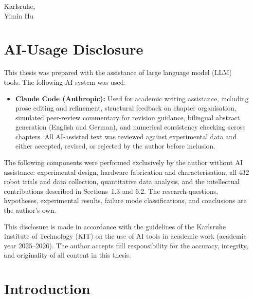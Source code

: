 \documentclass[12pt, a4paper]{report}
\begin{document}
\vspace{1.5cm}
\noindent Karlsruhe, \hspace{3cm} \underline{\hspace{5cm}}\\
\hspace*{4.5cm} Yimin Hu

\chapter*{AI-Usage Disclosure}

This thesis was prepared with the assistance of large language model (LLM) tools. The following AI system was used:

\begin{itemize}
  \item \textbf{Claude Code (Anthropic):} Used for academic writing assistance, including prose editing and refinement, structural feedback on chapter organisation, simulated peer-review commentary for revision guidance, bilingual abstract generation (English and German), and numerical consistency checking across chapters. All AI-assisted text was reviewed against experimental data and either accepted, revised, or rejected by the author before inclusion.
\end{itemize}

The following components were performed exclusively by the author without AI assistance: experimental design, hardware fabrication and characterisation, all 432 robot trials and data collection, quantitative data analysis, and the intellectual contributions described in Sections~1.3 and 6.2. The research questions, hypotheses, experimental results, failure mode classifications, and conclusions are the author's own.

This disclosure is made in accordance with the guidelines of the Karlsruhe Institute of Technology (KIT) on the use of AI tools in academic work (academic year 2025--2026). The author accepts full responsibility for the accuracy, integrity, and originality of all content in this thesis.

\tableofcontents
\listoffigures
\listoftables


\chapter{Introduction}
\end{document}
